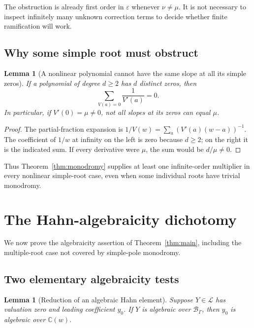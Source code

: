 \documentclass[11pt,a4paper]{article}
\numberwithin{equation}{section}
\newtheorem{lemma}[theorem]{Lemma}
\theoremstyle{definition}
\theoremstyle{remark}
\newcommand{\C}{\mathbb C}
\newcommand{\B}{\mathscr B_\Gamma}
\newcommand{\eps}{\varepsilon}
\begin{document}
The obstruction is already first order in $\eps$ whenever $\nu\ne\mu$.
It is not necessary to inspect infinitely many unknown correction terms to
decide whether finite ramification will work.

\subsection{Why some simple root must obstruct}

\begin{lemma}[A nonlinear polynomial cannot have the same slope at all its
simple zeros]\label{lem:slopes}
If a polynomial of degree $d\ge2$ has $d$ distinct zeros, then
\begin{equation}\label{eq:residuesum}
 \sum_{V(a)=0}\frac1{V'(a)}=0.
\end{equation}
In particular, if $V'(0)=\mu\ne0$, not all slopes at its zeros can equal
$\mu$.
\end{lemma}

\begin{proof}
The partial-fraction expansion is
$1/V(w)=\sum_a(V'(a)(w-a))^{-1}$.  The coefficient of $1/w$ at infinity
on the left is zero because $d\ge2$; on the right it is the indicated sum.
If every derivative were $\mu$, the sum would be $d/\mu\ne0$.
\end{proof}

Thus Theorem~\ref{thm:monodromy} supplies at least one infinite-order
multiplier in every nonlinear simple-root case, even when some individual
roots have trivial monodromy.

\section{The Hahn-algebraicity dichotomy}
\label{sec:algebraicity}

We now prove the algebraicity assertion of Theorem~\ref{thm:main}, including
the multiple-root case not covered by simple-pole monodromy.

\subsection{Two elementary algebraicity tests}

\begin{lemma}[Reduction of an algebraic Hahn element]
\label{lem:reduction}
Suppose $Y\in\mathscr L$ has valuation zero and leading coefficient $y_0$.
If $Y$ is algebraic over $\B$, then $y_0$ is algebraic over $\C(w)$.
\end{lemma}
\end{document}
